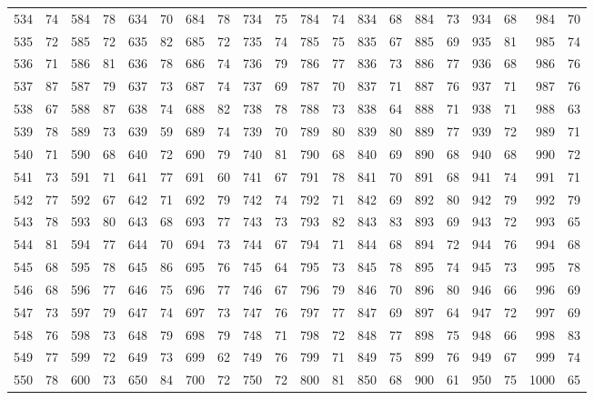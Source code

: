 \begin{tabular}{@{}rr|rr|rr|rr|rr|rr|rr|rr|rr|rr@{}}
534 & 74 & 584 & 78 & 634 & 70 & 684 & 78 & 734 & 75 & 784 & 74 & 834 & 68 & 884 & 73 & 934 & 68 & 984 & 70 \\
535 & 72 & 585 & 72 & 635 & 82 & 685 & 72 & 735 & 74 & 785 & 75 & 835 & 67 & 885 & 69 & 935 & 81 & 985 & 74 \\
536 & 71 & 586 & 81 & 636 & 78 & 686 & 74 & 736 & 79 & 786 & 77 & 836 & 73 & 886 & 77 & 936 & 68 & 986 & 76 \\
537 & 87 & 587 & 79 & 637 & 73 & 687 & 74 & 737 & 69 & 787 & 70 & 837 & 71 & 887 & 76 & 937 & 71 & 987 & 76 \\
538 & 67 & 588 & 87 & 638 & 74 & 688 & 82 & 738 & 78 & 788 & 73 & 838 & 64 & 888 & 71 & 938 & 71 & 988 & 63 \\
539 & 78 & 589 & 73 & 639 & 59 & 689 & 74 & 739 & 70 & 789 & 80 & 839 & 80 & 889 & 77 & 939 & 72 & 989 & 71 \\
540 & 71 & 590 & 68 & 640 & 72 & 690 & 79 & 740 & 81 & 790 & 68 & 840 & 69 & 890 & 68 & 940 & 68 & 990 & 72 \\[1pt]
541 & 73 & 591 & 71 & 641 & 77 & 691 & 60 & 741 & 67 & 791 & 78 & 841 & 70 & 891 & 68 & 941 & 74 & 991 & 71 \\
542 & 77 & 592 & 67 & 642 & 71 & 692 & 79 & 742 & 74 & 792 & 71 & 842 & 69 & 892 & 80 & 942 & 79 & 992 & 79 \\
543 & 78 & 593 & 80 & 643 & 68 & 693 & 77 & 743 & 73 & 793 & 82 & 843 & 83 & 893 & 69 & 943 & 72 & 993 & 65 \\
544 & 81 & 594 & 77 & 644 & 70 & 694 & 73 & 744 & 67 & 794 & 71 & 844 & 68 & 894 & 72 & 944 & 76 & 994 & 68 \\
545 & 68 & 595 & 78 & 645 & 86 & 695 & 76 & 745 & 64 & 795 & 73 & 845 & 78 & 895 & 74 & 945 & 73 & 995 & 78 \\
546 & 68 & 596 & 77 & 646 & 75 & 696 & 77 & 746 & 67 & 796 & 79 & 846 & 70 & 896 & 80 & 946 & 66 & 996 & 69 \\
547 & 73 & 597 & 79 & 647 & 74 & 697 & 73 & 747 & 76 & 797 & 77 & 847 & 69 & 897 & 64 & 947 & 72 & 997 & 69 \\
548 & 76 & 598 & 73 & 648 & 79 & 698 & 79 & 748 & 71 & 798 & 72 & 848 & 77 & 898 & 75 & 948 & 66 & 998 & 83 \\
549 & 77 & 599 & 72 & 649 & 73 & 699 & 62 & 749 & 76 & 799 & 71 & 849 & 75 & 899 & 76 & 949 & 67 & 999 & 74 \\
550 & 78 & 600 & 73 & 650 & 84 & 700 & 72 & 750 & 72 & 800 & 81 & 850 & 68 & 900 & 61 & 950 & 75 & 1000 & 65 \\
\hline\end{tabular}\par\endgroup


